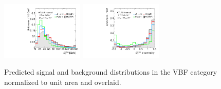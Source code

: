 \begin{figure}[tp]
  \includegraphics[width=0.35\textwidth]{figures/overlaid/vbf/met-pt-hi}
  \includegraphics[width=0.35\textwidth]{figures/overlaid/vbf/met-phi-centrality}
  \caption{Predicted signal and background distributions in the VBF category normalized to unit area and overlaid.}
  \label{fig:strategy-overlaid-vbf-taus}
\end{figure}
